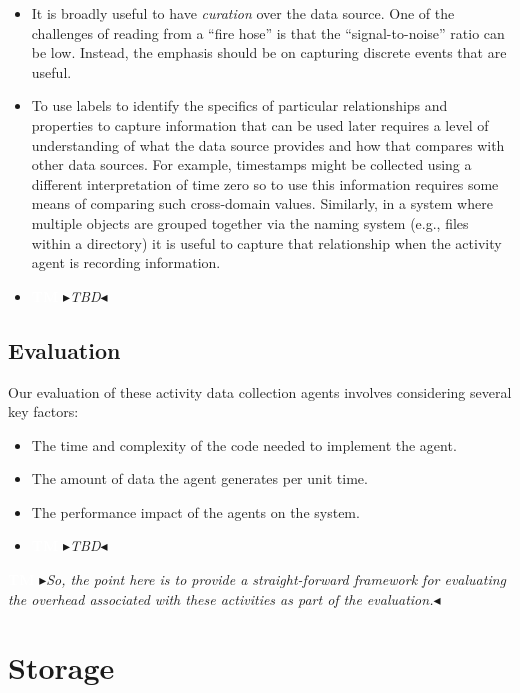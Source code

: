 \documentclass[sigconf,anonymous,review]{acmart}
\newcommand{\nbc}[3]{
 {\colorbox{#3}{\bfseries\sffamily\scriptsize\textcolor{white}{#1}}}
 {\textcolor{#3}{\sf\small$\blacktriangleright$\textit{#2}$\blacktriangleleft$}}}
\newcommand\tm[1]{\nbc{TM}{#1}{tmcolor}}
\begin{document}
\begin{itemize}
    \item It is broadly useful to have \emph{curation} over the data source.
    One of the challenges of reading from a ``fire hose'' is that the
    ``signal-to-noise'' ratio can be low.  Instead, the emphasis should be on
    capturing discrete events that are useful.

    \item To use labels to identify the specifics of particular relationships
    and properties to capture information that can be used later requires a
    level of understanding of what the data source provides and how that
    compares with other data sources.  For example, timestamps might be
    collected using a different interpretation of time zero so to use this
    information requires some means of comparing such cross-domain values.
    Similarly, in a system where multiple objects are grouped together via the
    naming system (e.g., files within a directory) it is useful to capture that
    relationship when the activity agent is recording information.

    \item \tm{TBD}
\end{itemize}

\subsection{Evaluation}

Our evaluation of these activity data collection agents involves considering
several key factors:

\begin{itemize}
    \item The time and complexity of the code needed to implement the agent.
    \item The amount of data the agent generates per unit time.
    \item The performance impact of the agents on the system.
    \item \tm{TBD}
\end{itemize}

\tm{So, the point here is to provide a straight-forward framework for evaluating
the overhead associated with these activities as part of the evaluation.}

\section{Storage}
\label{sec:storage}
\end{document}

